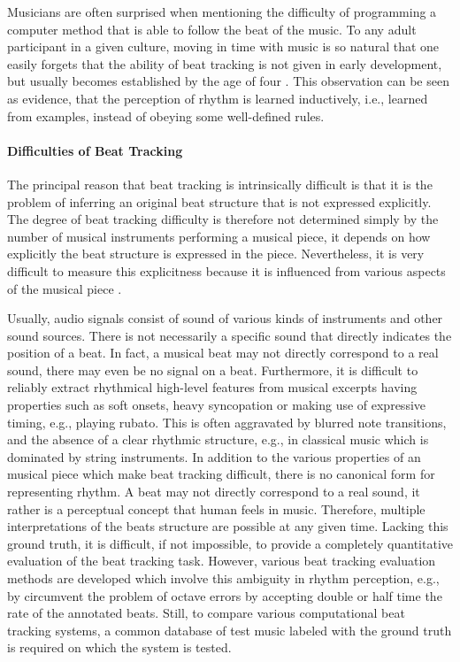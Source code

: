 \documentclass{scrartcl}
\begin{document}
\label{sec:difficulties}

Musicians are often surprised when mentioning the difficulty of programming a computer method that is able to follow the beat of the music. To any adult participant in a given culture, moving in time with music is so natural that one easily forgets that the ability of beat tracking is not given in early development, but usually becomes established by the age of four \cite{Drake2000}. This observation can be seen as evidence, that the perception of rhythm is learned inductively, i.e., learned from examples, instead of obeying some well-defined rules.


\paragraph{Difficulties of Beat Tracking}
The principal reason that beat tracking is intrinsically difficult is that it is the problem of inferring an original beat structure that is not expressed explicitly. The degree of beat tracking difficulty is therefore not determined simply by the number of musical instruments performing a musical piece, it depends on how explicitly the beat structure is expressed in the piece. Nevertheless, it is very difficult to measure this explicitness because it is influenced from various aspects of the musical piece \cite{Quinton2016}.

Usually, audio signals consist of sound of various kinds of instruments and other sound sources. There is not necessarily a specific sound that directly indicates the position of a beat. In fact, a musical beat may not directly correspond to a real sound, there may even be no signal on a beat. Furthermore, it is difficult to reliably extract rhythmical high-level features from musical excerpts having properties such as soft onsets, heavy syncopation or making use of expressive timing, e.g., playing rubato. This is often aggravated by blurred note transitions, and the absence of a clear rhythmic structure, e.g., in classical music which is dominated by string instruments. In addition to the various properties of an musical piece which make beat tracking difficult, there is no canonical form for representing rhythm. A beat may not directly correspond to a real sound, it rather is a perceptual concept that human feels in music. Therefore, multiple interpretations of the beats structure are possible at any given time. Lacking this ground truth, it is difficult, if not impossible, to provide a completely quantitative evaluation of the beat tracking task. However, various beat tracking evaluation methods are developed which involve this ambiguity in rhythm perception, e.g., by circumvent the problem of octave errors by accepting double or half time the rate of the annotated beats. Still, to compare various computational beat tracking systems, a common database of test music labeled with the ground truth is required on which the system is tested. 
\end{document}
